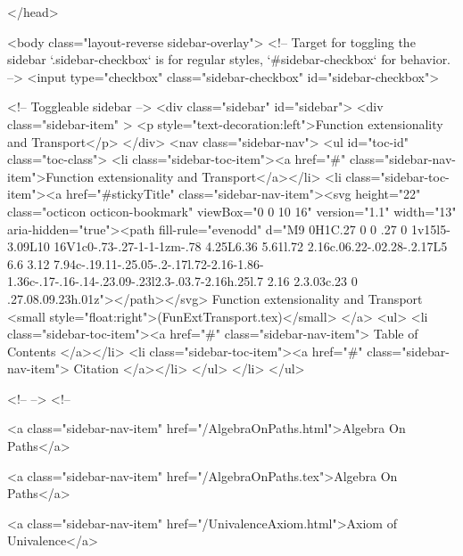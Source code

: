 </head>


  <body class="layout-reverse sidebar-overlay">
    <!-- Target for toggling the sidebar `.sidebar-checkbox` is for regular
     styles, `#sidebar-checkbox` for behavior. -->
<input type="checkbox" class="sidebar-checkbox" id="sidebar-checkbox">

<!-- Toggleable sidebar -->
<div class="sidebar" id="sidebar">
  <div class="sidebar-item" >
    <p style="text-decoration:left">Function extensionality and Transport</p>
  </div>
  <nav class="sidebar-nav">
    <ul id="toc-id" class="toc-class">
  <li class="sidebar-toc-item"><a href="#" class="sidebar-nav-item">Function extensionality and Transport</a></li>
  <li class="sidebar-toc-item"><a href="#stickyTitle" class="sidebar-nav-item"><svg height="22" class="octicon octicon-bookmark" viewBox="0 0 10 16" version="1.1" width="13" aria-hidden="true"><path fill-rule="evenodd" d="M9 0H1C.27 0 0 .27 0 1v15l5-3.09L10 16V1c0-.73-.27-1-1-1zm-.78 4.25L6.36 5.61l.72 2.16c.06.22-.02.28-.2.17L5 6.6 3.12 7.94c-.19.11-.25.05-.2-.17l.72-2.16-1.86-1.36c-.17-.16-.14-.23.09-.23l2.3-.03.7-2.16h.25l.7 2.16 2.3.03c.23 0 .27.08.09.23h.01z"></path></svg> Function extensionality and Transport <small style="float:right">(FunExtTransport.tex)</small>
</a>
    <ul>
      <li class="sidebar-toc-item"><a href="#" class="sidebar-nav-item"> Table of Contents </a></li>
      <li class="sidebar-toc-item"><a href="#" class="sidebar-nav-item"> Citation </a></li>
    </ul>
  </li>
</ul>


    <!--  -->
    <!-- 
      
    
      
    
      
    
      
        
      
    
      
        
          <a class="sidebar-nav-item" href="/AlgebraOnPaths.html">Algebra On Paths</a>
        
      
    
      
        
          <a class="sidebar-nav-item" href="/AlgebraOnPaths.tex">Algebra On Paths</a>
        
      
    
      
        
          <a class="sidebar-nav-item" href="/UnivalenceAxiom.html">Axiom of Univalence</a>
        
      
    
      
        
